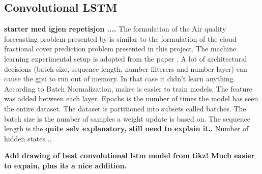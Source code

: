 \subsection{Convolutional LSTM}
\textbf{starter med igjen repetisjon ....}
The formulation of the Air quality forecasting problem presented by  \citeauthor{SunAirLSTM} is similar to the formulation of the cloud fractional cover prediction problem presented in this project. The machine learning experimental setup is adopted from the paper . 
A lot of architectural decisions (batch size, sequence length, number filterers and number layer) can cause the \acrshort{gpu} to run out of memory. In that case it didn't learn anything. According to  Batch Normalization, makes is easier to train models. The feature was added between each layer. Epochs is the number of times the model has seen the entire dataset. The dataset is partitioned into subsets called batches. The batch size is the number of samples a weight update is based on. The sequence length is the \textbf{quite selv explanatory, still need to explain it.. } Number of hidden states .. 

\begin{table}[]
    \centering
    \caption{Configuration of traninable convolutional lstm models. \textbf{r2 er veldig merkelig foreløbig, includere mae?} TODO: Add list of model configurations which actually learn something.}
    \label{tab:convlstm_config}
\end{table}

\textbf{Add drawing of best convolutional lstm model from tikz! Much easier to expain, plus its a nice addition.}


